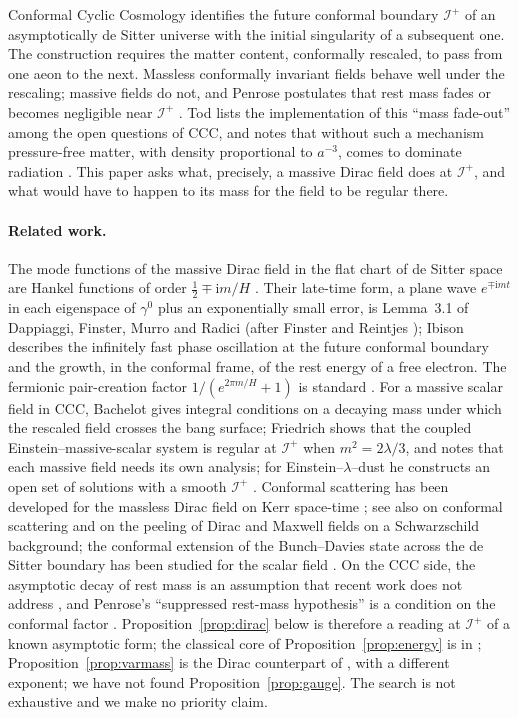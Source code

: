 \documentclass[11pt,a4paper]{article}
\theoremstyle{definition}
\newcommand{\scri}{\mathscr{I}^{+}}
\newcommand{\ii}{\mathrm{i}}
\begin{document}
Conformal Cyclic Cosmology \cite{Penrose2010,Tod2015,MeissnerPenrose2025} identifies the future conformal boundary $\scri$ of an asymptotically de Sitter universe with the initial singularity of a subsequent one. The construction requires the matter content, conformally rescaled, to pass from one aeon to the next. Massless conformally invariant fields behave well under the rescaling; massive fields do not, and Penrose postulates that rest mass fades or becomes negligible near $\scri$ \cite{Penrose2010}. Tod lists the implementation of this ``mass fade-out'' among the open questions of CCC, and notes that without such a mechanism pressure-free matter, with density proportional to $a^{-3}$, comes to dominate radiation \cite{Tod2022}. This paper asks what, precisely, a massive Dirac field does at $\scri$, and what would have to happen to its mass for the field to be regular there.

\paragraph{Related work.} The mode functions of the massive Dirac field in the flat chart of de Sitter space are Hankel functions of order $\tfrac12\mp\ii m/H$ \cite{Cotaescu2002}. Their late-time form, a plane wave $e^{\mp\ii mt}$ in each eigenspace of $\gamma^{0}$ plus an exponentially small error, is Lemma~3.1 of Dappiaggi, Finster, Murro and Radici \cite{DFMR2019} (after Finster and Reintjes \cite{FinsterReintjes2016}); Ibison \cite{Ibison2011} describes the infinitely fast phase oscillation at the future conformal boundary and the growth, in the conformal frame, of the rest energy of a free electron. The fermionic pair-creation factor $1/(e^{2\pi m/H}+1)$ is standard \cite{Boonpan2026,BirrellDavies}. For a massive scalar field in CCC, Bachelot \cite{Bachelot2020} gives integral conditions on a decaying mass under which the rescaled field crosses the bang surface; Friedrich \cite{Friedrich2015} shows that the coupled Einstein--massive-scalar system is regular at $\scri$ when $m^{2}=2\lambda/3$, and notes that each massive field needs its own analysis; for Einstein--$\lambda$--dust he constructs an open set of solutions with a smooth $\scri$ \cite{Friedrich2017}. Conformal scattering has been developed for the massless Dirac field on Kerr space-time \cite{Pham2021}; see also \cite{MasonNicolas2004} on conformal scattering and \cite{MasonNicolas2012} on the peeling of Dirac and Maxwell fields on a Schwarzschild background; the conformal extension of the Bunch--Davies state across the de Sitter boundary has been studied for the scalar field \cite{Wrochna2017}. On the CCC side, the asymptotic decay of rest mass is an assumption that recent work does not address \cite{MarkwellStevens2022}, and Penrose's ``suppressed rest-mass hypothesis'' is a condition on the conformal factor \cite{GurzadyanPenrose2013,MarkwellStevens2022}. Proposition~\ref{prop:dirac} below is therefore a reading at $\scri$ of a known asymptotic form; the classical core of Proposition~\ref{prop:energy} is in \cite{Ibison2011}; Proposition~\ref{prop:varmass} is the Dirac counterpart of \cite{Bachelot2020}, with a different exponent; we have not found Proposition~\ref{prop:gauge}. The search is not exhaustive and we make no priority claim.
\end{document}
